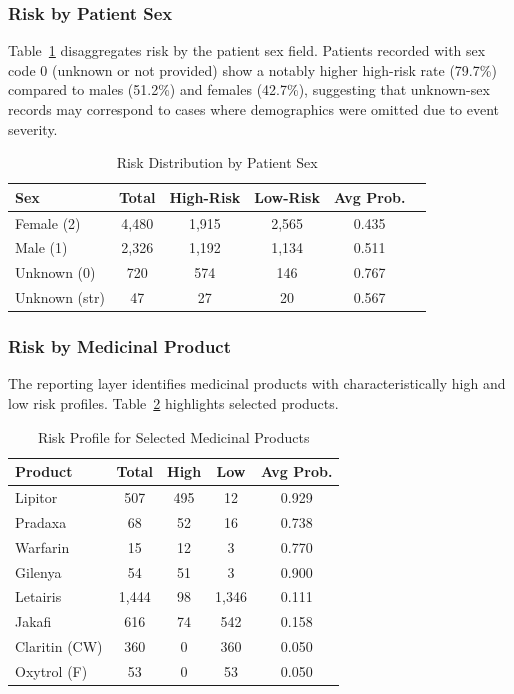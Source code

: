 \documentclass[conference]{IEEEtran}
\begin{document}
\subsubsection{Risk by Patient Sex}
Table~\ref{tab:risk_sex} disaggregates risk by the patient sex field. Patients recorded with sex code 0 (unknown or not provided) show a notably higher high-risk rate (79.7\%) compared to males (51.2\%) and females (42.7\%), suggesting that unknown-sex records may correspond to cases where demographics were omitted due to event severity.

\begin{table}[htbp]
\caption{Risk Distribution by Patient Sex}
\label{tab:risk_sex}
\centering
\begin{tabular}{lccccc}
\toprule
\textbf{Sex} & \textbf{Total} & \textbf{High-Risk} & \textbf{Low-Risk} & \textbf{Avg Prob.} \\
\midrule
Female (2)   & 4,480 & 1,915 & 2,565 & 0.435 \\
Male (1)     & 2,326 & 1,192 & 1,134 & 0.511 \\
Unknown (0)  & 720   & 574   & 146   & 0.767 \\
Unknown (str)& 47    & 27    & 20    & 0.567 \\
\bottomrule
\end{tabular}
\end{table}

\subsubsection{Risk by Medicinal Product}
The reporting layer identifies medicinal products with characteristically high and low risk profiles. Table~\ref{tab:risk_products} highlights selected products.

\begin{table}[htbp]
\caption{Risk Profile for Selected Medicinal Products}
\label{tab:risk_products}
\centering
\begin{tabular}{lcccc}
\toprule
\textbf{Product} & \textbf{Total} & \textbf{High} & \textbf{Low} & \textbf{Avg Prob.} \\
\midrule
Lipitor       & 507  & 495 & 12  & 0.929 \\
Pradaxa       & 68   & 52  & 16  & 0.738 \\
Warfarin      & 15   & 12  & 3   & 0.770 \\
Gilenya       & 54   & 51  & 3   & 0.900 \\
Letairis      & 1,444 & 98  & 1,346 & 0.111 \\
Jakafi        & 616  & 74  & 542 & 0.158 \\
Claritin (CW) & 360  & 0   & 360 & 0.050 \\
Oxytrol (F)   & 53   & 0   & 53  & 0.050 \\
\bottomrule
\end{tabular}
\end{table}
\end{document}
